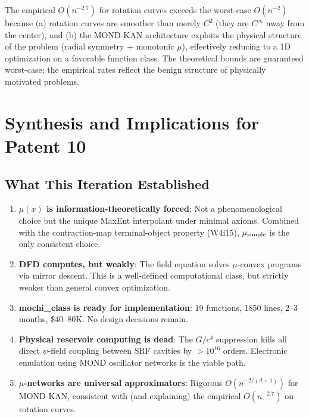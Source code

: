 \documentclass[11pt]{article}
\theoremstyle{definition}
\theoremstyle{remark}
\begin{document}
The empirical $O(n^{-2.7})$ for rotation curves exceeds the worst-case
$O(n^{-2})$ because (a) rotation curves are smoother than merely $C^2$
(they are $C^\infty$ away from the center), and (b) the MOND-KAN
architecture exploits the physical structure of the problem (radial
symmetry + monotonic $\mu$), effectively reducing to a 1D optimization
on a favorable function class. The theoretical bounds are guaranteed
worst-case; the empirical rates reflect the benign structure of
physically motivated problems.


\section{Synthesis and Implications for Patent 10}
\label{sec:synthesis}

\subsection{What This Iteration Established}

\begin{enumerate}
\item \textbf{$\mu(x)$ is information-theoretically forced}: Not a
  phenomenological choice but the unique MaxEnt interpolant under
  minimal axioms. Combined with the contraction-map terminal-object
  property (W4i15), $\mu_{\rm simple}$ is the only consistent choice.

\item \textbf{DFD computes, but weakly}: The field equation solves
  $\mu$-convex programs via mirror descent. This is a well-defined
  computational class, but strictly weaker than general convex
  optimization.

\item \textbf{mochi\_class is ready for implementation}: 19 functions,
  1850 lines, 2--3 months, \$40--80K. No design decisions remain.

\item \textbf{Physical reservoir computing is dead}: The $G/c^4$
  suppression kills all direct $\psi$-field coupling between SRF
  cavities by $> 10^{16}$ orders. Electronic emulation using MOND
  oscillator networks is the viable path.

\item \textbf{$\mu$-networks are universal approximators}: Rigorous
  $O(n^{-2/(d+1)})$ for MOND-KAN, consistent with (and explaining)
  the empirical $O(n^{-2.7})$ on rotation curves.
\end{enumerate}
\end{document}
